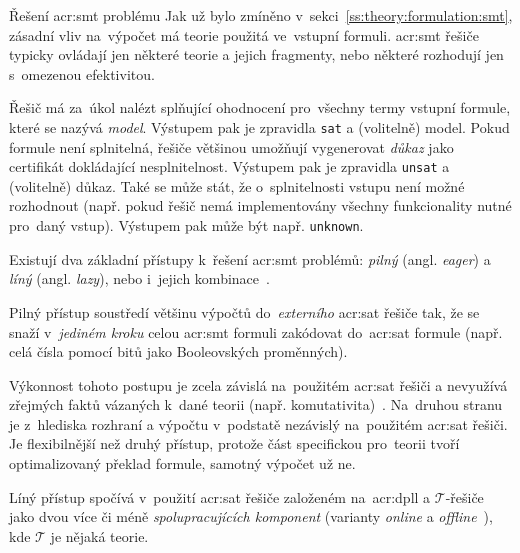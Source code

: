 \documentclass[thesis=M,czech]{FITthesis}[2012/06/26]
\newcommand{\acrlabel}[1]{acr:#1}
\newcommand{\acr}[1]{\acrshort{\acrlabel{#1}}}
\newcommand{\id}[1]{\texttt{#1}}
\newcommand{\hl}[1]{\textit{#1}}
\newcommand{\name}[1]{\hl{#1}}
\newcommand{\cit}[1]{\cite{#1}}
\newcommand{\rf}[1]{\ref{#1}}
\newcommand{\set}[1]{\ensuremath{\mathcal{#1}}}
\begin{document}

\begin{section}{Řešení \acr{smt} problému}\label{s:search:smt}
Jak už bylo zmíněno v~sekci~\rf{ss:theory:formulation:smt},
zásadní vliv na~výpočet má teorie použitá ve~vstupní formuli.
\acr{smt} řešiče typicky ovládají jen některé teorie
a jejich fragmenty, nebo některé rozhodují jen s~omezenou efektivitou.

Řešič má za~úkol nalézt splňující ohodnocení
pro~všechny termy vstupní formule,
které se nazývá \name{model}.
Výstupem pak je zpravidla \id{sat} a (volitelně) model.
Pokud formule není splnitelná,
řešiče většinou umožňují vygenerovat
\hl{důkaz} jako certifikát dokládající nesplnitelnost.
Výstupem pak je zpravidla \id{unsat}
a (volitelně) důkaz.
Také se může stát,
že o~splnitelnosti vstupu není možné rozhodnout
(např. pokud řešič nemá implementovány
všechny funkcionality nutné pro~daný vstup).
Výstupem pak může být např. \id{unknown}.

Existují dva základní přístupy k~řešení \acr{smt} problémů:
\name{pilný} (angl. \name{eager}) a \name{líný} (angl. \name{lazy}),
nebo i~jejich kombinace~\cit{smt-stanford}.


\begin{paragraph}{Pilný přístup}\label{p:search:smt:eager}
soustředí většinu výpočtů
do~\hl{externího} \acr{sat} řešiče tak,
že se snaží v~\hl{jediném kroku} celou \acr{smt} formuli zakódovat
do~\acr{sat} formule (např. celá čísla pomocí bitů
jako Booleovských proměnných).

Výkonnost tohoto postupu je zcela závislá na~použitém \acr{sat} řešiči
a nevyužívá zřejmých faktů vázaných k~dané teorii
(např. komutativita)~\cit{smt}.
Na~druhou stranu je z~hlediska rozhraní a výpočtu
v~podstatě nezávislý na~použitém \acr{sat} řešiči.
Je flexibilnější než druhý přístup,
protože část specifickou pro~teorii tvoří 
optimalizovaný překlad formule,
samotný výpočet už ne.
\end{paragraph} %


\begin{paragraph}{Líný přístup}\label{p:search:smt:lazy}
spočívá v~použití \acr{sat} řešiče
založeném na~\acr{dpll}
a \set{T}-řešiče
jako dvou více či méně \hl{spolupracujících komponent}
(varianty \name{online} a \name{offline}~\cit{smt-stanford}),
kde \set{T} je nějaká teorie.


\end{paragraph}
\end{section}
\end{document}
